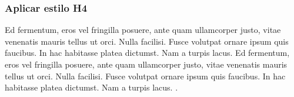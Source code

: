 \documentclass[10.5pt,17.35pt,a4paper]{article}
\begin{document}
\subsubsection{Aplicar estilo H4}
 
Ed fermentum, eros vel fringilla posuere, ante quam ullamcorper justo, vitae venenatis mauris tellus ut orci. Nulla facilisi. Fusce volutpat ornare ipsum quis faucibus. In hac habitasse platea dictumst. Nam a turpis lacus. Ed fermentum, eros vel fringilla posuere, ante quam ullamcorper justo, vitae venenatis mauris tellus ut orci. Nulla facilisi. Fusce volutpat ornare ipsum quis faucibus. In hac habitasse platea dictumst. Nam a turpis lacus. \citep{Rajao2020, Staal2020}.
\newpage

\renewcommand{\refname}{Referências Bibliográficas}


\newpage


\finalpageamz

\end{document}

